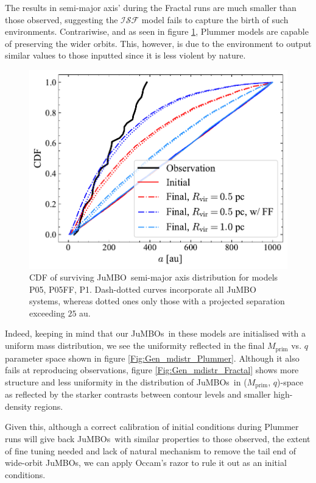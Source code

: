 \documentclass[submission,phys]{lib/SciPost}
\newcommand{\jumbo}{\mbox{JuMBO}}
\newcommand{\jumbos}{\mbox{JuMBOs}}
\begin{document}
    The results in semi-major axis' during the Fractal runs are much smaller than those observed, suggesting the $\mathcal{ISF}$ model fails to capture the birth of such environments. Contrariwise, and as seen in figure \ref{Fig:Gen_Semi_Plummer}, Plummer models are capable of preserving the wider orbits. This, however, is due to the environment to output similar values to those inputted since it is less violent by nature.
   
   \begin{figure}
    \centering
        \includegraphics[width=\columnwidth]{figures/Plummer_General_sem_axis.pdf}
        \caption{CDF of surviving \jumbo\, semi-major axis distribution for models P05, P05FF, P1. Dash-dotted curves incorporate all \jumbo\, systems, whereas dotted ones only those with a projected separation exceeding $25$ au.}
         \label{Fig:Gen_Semi_Plummer}
   \end{figure}

    Indeed, keeping in mind that our \jumbos\, in these models are initialised with a uniform mass distribution, we see the uniformity reflected in the final $M_{\mathrm{prim}}$ vs. $q$ parameter space shown in figure \ref{Fig:Gen_mdistr_Plummer}. Although it also fails at reproducing observations, figure \ref{Fig:Gen_mdistr_Fractal} shows more structure and less uniformity in the distribution of \jumbos\, in ($M_{\mathrm{prim}}$, $q$)-space as reflected by the starker contrasts between contour levels and smaller high-density regions.
    
    Given this, although a correct calibration of initial conditions during Plummer runs will give back \jumbos\, with similar properties to those observed, the extent of fine tuning needed and lack of natural mechanism to remove the tail end of wide-orbit \jumbos, we can apply Occam's razor to rule it out as an initial conditions. 
    
\end{document}
